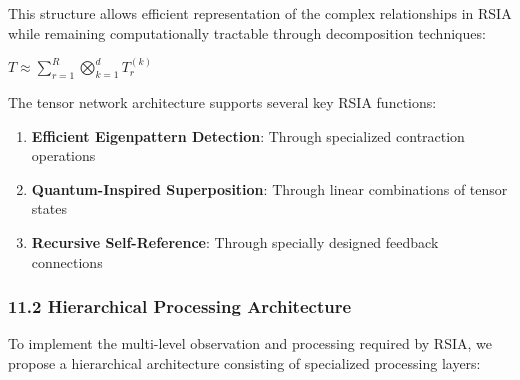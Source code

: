 \documentclass[12pt]{article}
\providecommand{\tightlist}{%
  \setlength{\itemsep}{0pt}\setlength{\parskip}{0pt}}
\begin{document}
This structure allows efficient representation of the complex
relationships in RSIA while remaining computationally tractable through
decomposition techniques:

\(T \approx \sum_{r=1}^R \bigotimes_{k=1}^d T^{(k)}_r\)

The tensor network architecture supports several key RSIA functions:

\begin{enumerate}
\def\labelenumi{\arabic{enumi}.}
\tightlist
\item
  \textbf{Efficient Eigenpattern Detection}: Through specialized
  contraction operations
\item
  \textbf{Quantum-Inspired Superposition}: Through linear combinations
  of tensor states
\item
  \textbf{Recursive Self-Reference}: Through specially designed feedback
  connections
\end{enumerate}

\subsubsection{11.2 Hierarchical Processing
Architecture}\label{hierarchical-processing-architecture}

To implement the multi-level observation and processing required by
RSIA, we propose a hierarchical architecture consisting of specialized
processing layers:
\end{document}
